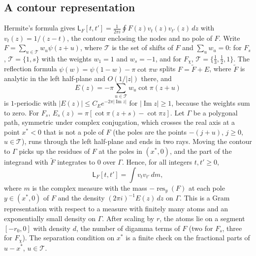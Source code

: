 \documentclass[11pt]{amsart}
\theoremstyle{definition}
\theoremstyle{remark}
\numberwithin{equation}{section}
\renewcommand{\Im}{\operatorname{Im}}
\newcommand{\Lw}{\mathsf L}          %
\begin{document}
\subsection{A contour representation}
Hermite's formula gives $\Lw_F[t,t']=\frac1{2\pi i}\oint F(z)v_t(z)v_{t'}(z)\,dz$ with $v_t(z)=1/(z-t)$, the contour enclosing
the nodes and no pole of $F$. Write $F=\sum_{u\in\mathcal T}w_u\psi(z+u)$, where $\mathcal T$ is the set of shifts of $F$ and
$\sum_uw_u=0$: for $F_s$, $\mathcal T=\{1,s\}$ with the weights $w_1=1$ and $w_s=-1$, and for $F_\chi$,
$\mathcal T=\{\frac13,\frac12,1\}$. The reflection formula $\psi(w)=\psi(1-w)-\pi\cot\pi w$ splits $F=\tilde F+E$, where
$\tilde F$ is analytic in the left half-plane and $O(1/|z|)$ there, and
\[
 E(z)=-\pi\sum_{u\in\mathcal T}w_u\cot\pi(z+u)
\]
is $1$-periodic with $|E(z)|\le C_Ee^{-2\pi|\Im z|}$ for $|\Im z|\ge1$, because the weights sum to zero. For $F_s$,
$E_s(z)=\pi[\cot\pi(z+s)-\cot\pi z]$. Let $\Gamma$ be a polygonal path, symmetric under complex conjugation, which crosses
the real axis at a point $x^*<0$ that is not a pole of $F$ (the poles are the points $-(j+u)$, $j\ge0$, $u\in\mathcal T$),
runs through the left half-plane and ends in two rays. Moving the contour to $\Gamma$ picks up the residues of $F$ at the
poles in $(x^*,0)$, and the part of the integrand with $\tilde F$ integrates to $0$ over $\Gamma$. Hence, for all integers
$t,t'\ge0$,
\begin{equation}\label{eq:gram}
 \Lw_F[t,t']=\int v_tv_{t'}\,dm,
\end{equation}
where $m$ is the complex measure with the mass $-\operatorname{res}_y(F)$ at each pole $y\in(x^*,0)$ of $F$ and the density
$(2\pi i)^{-1}E(z)\,dz$ on $\Gamma$. This is a Gram representation with respect to a measure with finitely many atoms and
an exponentially small density on $\Gamma$. After scaling by $r$, the atoms lie on a segment $[-r_0,0]$ with density $d$, the number of digamma
terms of $F$ (two for $F_s$, three for $F_\chi$). The separation condition on $x^*$ is a finite check on the
fractional parts of $u-x^*$, $u\in\mathcal T$.
\end{document}
